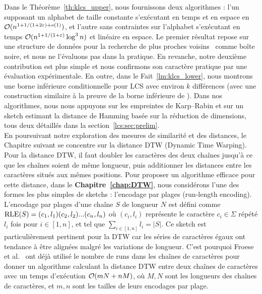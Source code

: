 Dans le Théorème~\ref{th:klcs_upper}, nous fournissons deux algorithmes : l'un supposant un alphabet de taille constante s'exécutant en temps et en espace en $\mathcal{O}(n^{1+ 1/(1+2\varepsilon) + o(1)})$, et l'autre sans contraintes sur l'alphabet s'exécutant en temps $\mathcal{O}(n^{1+1/(1+\varepsilon)} \log^3 n)$ et linéaire en espace. Le premier résultat repose sur une structure de données pour la recherche de plus proches voisins~\cite{DBLP:conf/stoc/AndoniR15} comme boîte noire, et nous ne l'évaluons pas dans la pratique. En revanche, notre deuxième contribution est plus simple et nous confirmons son caractère pratique par une évaluation expérimentale.
En outre, dans le \og{}Fait~\ref{lm:klcs_lower}\fg{}, nous montrons une borne inférieure conditionnelle pour LCS avec environ $k$ différences (avec une construction similaire à la preuve de la borne inférieure de \kLCS ).
Dans nos algorithmes, nous nous appuyons sur les empreintes de Karp--Rabin et sur un sketch estimant la distance de Hamming basée sur la réduction de dimensions, tous deux détaillés dans la section~\ref{lcs:sec:prelim}. \\


En poursuivant notre exploration des mesures de similarité et des distances, le Chapitre suivant se concentre sur la distance DTW (Dynamic Time Warping). Pour la distance DTW, il faut \og{}doubler\fg{} les caractères des deux chaînes jusqu'à ce que les chaînes soient de même longueur, puis additionner les distances entre les caractères situés aux mêmes positions.
Pour proposer un algorithme efficace pour cette distance, dans le \textbf{Chapitre~\ref{chap:DTW}}, nous considérons l'une des formes les plus simples de sketchs : l'encodage par plages (run-length encoding). L'encodage par plages d'une chaîne $S$ de longueur $N$ est défini comme $\mathrm{RLE}(S)=(c_1,l_1)(c_2,l_2)... (c_n,l_n)$ où $(c_i,l_i)$ représente le caractère $c_i \in \Sigma$ répété $l_i$ fois pour $i \in [1,n]$, et tel que $\sum_{i\in [1,n]} l_i = |S|$.
Ce sketch est particulièrement pertinent pour la DTW car les séries de caractères égaux ont tendance à être alignées malgré les variations de longueur. C'est pourquoi Froese et al.~\cite{DBLP:journals/corr/abs-1903-03003} ont déjà utilisé le nombre de runs dans les chaînes de caractères pour donner un algorithme calculant la distance DTW entre deux chaînes de caractères avec un temps d'exécution $\mathcal{O}(mN+nM)$, où $M,N$ sont les longueurs des chaînes de caractères, et $m, n$ sont les tailles de leurs encodages par plage.

